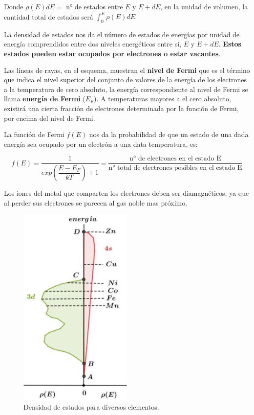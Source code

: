 Donde $\rho(E)dE =$ n° de estados entre $E$ y $E+dE$, en la unidad de volumen, la cantidad total de estados será $\int_{0}^{E} \rho(E)dE$

La densidad de estados nos da el número de estados de energías por unidad de energía comprendidos entre dos niveles energéticos entre sí, $E$ y $E+dE$. \textbf{Estos estados pueden estar ocupados por electrones o estar vacantes}.
 
Las líneas de rayas, en el esquema, muestran el \textbf{nivel de Fermi} que es el término que indica el nivel superior del conjunto de valores de la energía de los electrones a la temperatura de cero absoluto, la energía correspondiente al nivel de Fermi se llama \textbf{energía de Fermi} ($E_{F}$). A temperaturas mayores a el cero absoluto, existirá una cierta fracción de electrones determinada por la función de Fermi, por encima del nivel de Fermi.

La función de Fermi $f(E)$ nos da la probabilidad de que un estado de una dada energía sea
ocupado por un electrón a una data temperatura, es:

\begin{equation}
	f(E)=\dfrac{1}{exp\left(\dfrac{E-E_{F}}{kT}\right)  + 1} = \dfrac{\text{n° de electrones en el estado E}}{\text{n° total de electrones posibles en el estado E}}	
\end{equation}

Los iones del metal que comparten los electrones deben ser diamagnéticos, ya que al perder sus electrones se parecen al gas noble mas próximo.

\begin{figure}[H]
    \centering
    \includegraphics[width=0.5\textwidth]{./Figures/fig_s14}
	\caption{Densidad de estados para diversos elementos.}
	\label{fig:s14}
\end{figure}

